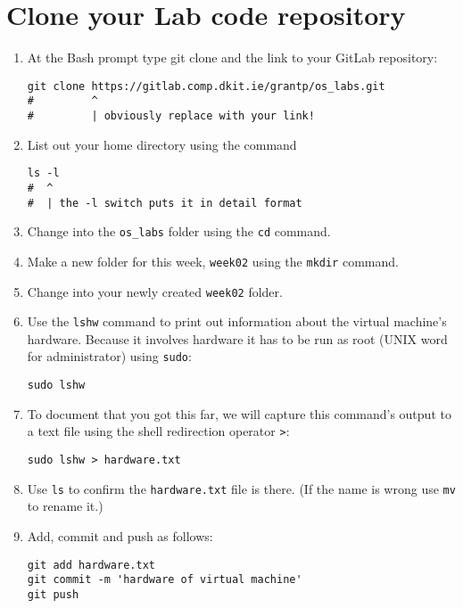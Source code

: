 \section{Clone your Lab code repository}

\begin{enumerate}
\item At the Bash prompt type git clone and the link to your GitLab repository:
\begin{verbatim}
git clone https://gitlab.comp.dkit.ie/grantp/os_labs.git
#         ^
#         | obviously replace with your link!
\end{verbatim}
\item List out your home directory using the command
\begin{verbatim}
ls -l
#  ^
#  | the -l switch puts it in detail format
\end{verbatim}
\item Change into the \texttt{os\_labs} folder using the \texttt{cd} command.
\item Make a new folder for this week, \texttt{week02} using the \texttt{mkdir} command.
\item Change into your newly created \texttt{week02} folder.
\item Use the \texttt{lshw} command to print out information about the virtual machine's hardware.
  Because it involves hardware it has to be run as root (UNIX word for administrator) using \texttt{sudo}:
\begin{verbatim}
sudo lshw
\end{verbatim}
\item To document that you got this far, we will capture this command's output to a text file using the shell redirection operator \texttt{>}:
\begin{verbatim}
sudo lshw > hardware.txt
\end{verbatim}
\item Use \texttt{ls} to confirm the \texttt{hardware.txt} file is there.
  (If the name is wrong use \texttt{mv} to rename it.)
\item Add, commit and push as follows:
\begin{verbatim}
git add hardware.txt
git commit -m 'hardware of virtual machine'
git push 
\end{verbatim}
\end{enumerate}
